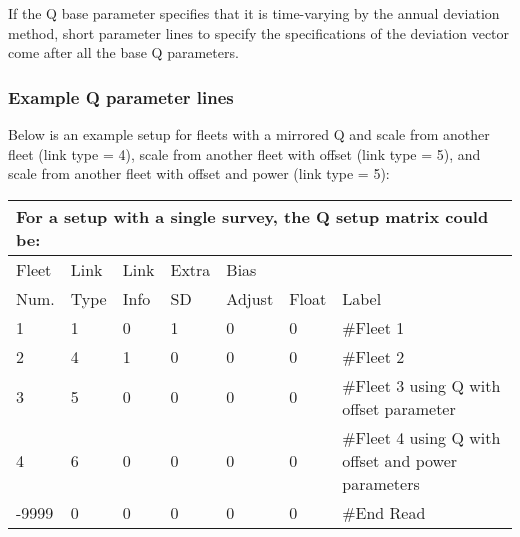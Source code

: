 If the Q base parameter specifies that it is time-varying by the annual deviation method, short parameter lines to specify the specifications of the deviation vector come after all the base Q parameters.

\hypertarget{QParams}{}
\subsubsection{Example Q parameter lines}
Below is an example setup for fleets with a mirrored Q and scale from another fleet (link type = 4), scale from another fleet with offset (link type = 5), and scale from another fleet with offset and power (link type = 5):
\begin{longtable}{p{1cm} p{1cm} p{1cm} p{1cm} p{1cm} p{1cm} p{7.6cm}}
	\multicolumn{7}{l}{For a setup with a single survey, the Q setup matrix could be:} \\
	\hline
	Fleet \Tstrut & Link & Link & Extra & Bias   & & \\
	Num.          & Type & Info & SD    & Adjust & Float & Label \Bstrut\\
	\hline
	1 & 1 & 0 & 1 & 0 & 0 & \#Fleet 1 \Tstrut\\
	2 & 4 & 1 & 0 & 0 & 0 & \#Fleet 2 \\
	3 & 5 & 0 & 0 & 0 & 0 & \#Fleet 3 using Q with offset parameter \\
    4 & 6 & 0 & 0 & 0 & 0 & \#Fleet 4 using Q with offset and power parameters \\
	-9999 & 0 & 0 & 0 & 0 & 0 & \#End Read \Bstrut\\
	\hline
\end{longtable}


